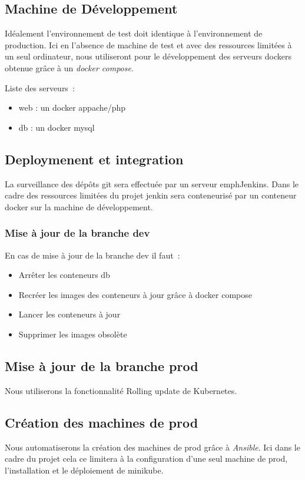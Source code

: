 \subsection{Machine de Développement}
Idéalement l’environnement de test doit identique à l’environnement de production. Ici en l’absence de machine de test et avec des ressources limitées à un seul ordinateur, nous utiliseront pour le développement des serveurs dockers obtenue grâce à un \emph{docker compose}.

Liste des serveurs~:
\begin{itemize}
\item web : un docker appache/php
\item db : un docker mysql
\end{itemize}

\subsection{Deploymenent et integration}
La surveillance des dépôts git sera effectuée par un serveur emph{Jenkins}. Dans le cadre des ressources limitées du projet jenkin sera conteneurisé par un conteneur docker sur la machine de développement.

\subsubsection{Mise à jour de la branche dev}
En cas de mise à jour de la branche dev il faut~:
\begin{itemize}
\item Arrêter les conteneurs db
\item Recréer les images des conteneurs à jour grâce à docker compose
\item Lancer les conteneurs à jour
\item Supprimer les images obsolète
\end{itemize}

\subsection{Mise à jour de la branche prod}
Nous utiliserons la fonctionnalité Rolling update de Kubernetes.

\subsection{Création des machines de prod}
Nous automatiserons la création des machines de prod grâce à \emph{Ansible}.
Ici dans le cadre du projet cela ce limitera à la configuration d'une seul machine de prod, l’installation et le déploiement de minikube.


